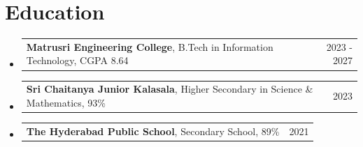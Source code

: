 \documentclass[letterpaper,11pt]{article}
\makeatletter
\newcommand{\resumeProjectHeading}[2]{
    \item
    \begin{tabular*}{0.97\textwidth}{l@{\extracolsep{\fill}}r}
      \small#1 & #2 \\
    \end{tabular*}\vspace{-7pt}
}
\newcommand{\resumeSubHeadingListStart}{\begin{itemize}[leftmargin=0.15in, label={}]}
\newcommand{\resumeSubHeadingListEnd}{\end{itemize}}
\makeatother
\begin{document}
\section{Education}
  \resumeSubHeadingListStart
    \resumeProjectHeading{\textbf{Matrusri Engineering College}, B.Tech in Information Technology, CGPA 8.64}{2023 - 2027}
    \resumeProjectHeading{\textbf{Sri Chaitanya Junior Kalasala}, Higher Secondary in Science \& Mathematics, 93\%}{2023}
    \resumeProjectHeading{\textbf{The Hyderabad Public School}, Secondary School, 89\%}{2021}
  \resumeSubHeadingListEnd
\end{document}
